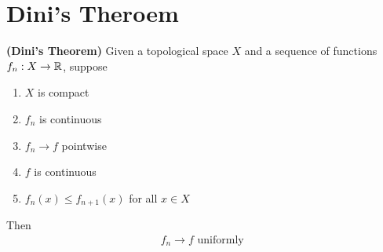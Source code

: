 \documentclass{report}
\begin{document}
\section{Dini's Theroem}
\begin{theorem}
\textbf{(Dini's Theorem)} Given a topological space $X$ and a sequence of functions  $f_n:X\rightarrow \mathbb{R}$, suppose
\begin{enumerate}[label=(\alph*)]
  \item $X$ is compact
  \item $f_n$ is continuous  
  \item $f_n\to f$ pointwise  
  \item $f$ is continuous  
  \item $f_n(x)\leq f_{n+1}(x)$ for all $x \in X$
\end{enumerate}
Then 
\begin{align*}
f_n \to f \text{ uniformly }
\end{align*}
\end{theorem}
\end{document}
